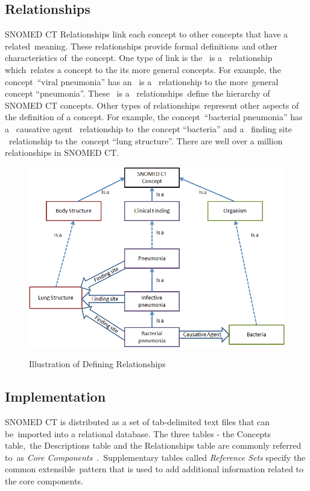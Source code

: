 \documentclass[DIV=calc, paper=a4, fontsize=12pt, onecolumn]{scrartcl}	 %
\begin{document}
\subsection{Relationships}
  SNOMED CT Relationships link each concept to other concepts that have a related\
  meaning. These relationships provide formal definitions and other characteristics of\
  the concept. One type of link is the \textbar ~is a \textbar ~relationship which\
  relates a concept to the its more general concepts. For example, the concept\
  ``viral pneumonia'' has an \textbar ~is a \textbar ~relationship to the more\
  general concept ``pneumonia''. These \textbar ~is a \textbar ~relationships\
  define the hierarchy of SNOMED CT concepts. Other types of relationships\
  represent other aspects of the definition of a concept. For example, the concept\
  ``bacterial pneumonia'' has a \textbar ~causative agent \textbar ~relationship to\
  the concept ``bacteria'' and a \textbar ~finding site \textbar ~relationship to the\
  concept ``lung structure''. There are well over a million relationships in SNOMED CT.
  \begin{figure}[h!]
    \centering
    \includegraphics[scale=0.5]{defining_relationship_example1.png}
    \caption{Illustration of Defining Relationships}\cite[Fig.~7]{snomed_-_user_guide_snomed_2011}
    \label{fig:snomedct_relationships}
  \end{figure}

\subsection{Implementation}
  SNOMED CT is distributed as a set of tab-delimited text files that can be\
  imported into a relational database. The three tables - the Concepts table,\
  the Descriptions table and the Relationships table are commonly referred to\
  as \emph{Core Components}~\cite{snomed_implementation_guide_snomed_2011}.\
  Supplementary tables called \emph{Reference Sets} specify the common extensible\
  pattern that is used to add additional information related to the core components.
\end{document}
